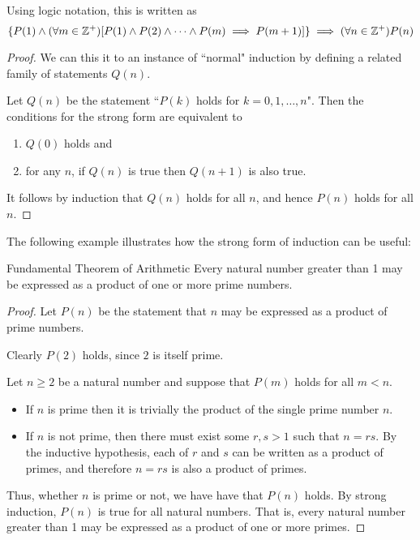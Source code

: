 Using logic notation, this is written as
\[ \{P(1) \land (\forall m \in \mathbb Z^+) [P(1) \land P(2) \land \cdots \land P(m) \implies P(m+1)]\} \implies (\forall n \in \mathbb Z^+)P(n) \]

\begin{proof}
We can this it to an instance of ``normal" induction by defining a related family of statements $Q(n)$. 

Let $Q(n)$ be the statement ``$P(k)$ holds for $k=0,1,\dots,n$". Then the conditions for the strong form are equivalent to 
\begin{enumerate}[label=(\roman*)]
\item $Q(0)$ holds and 
\item for any $n$, if $Q(n)$ is true then $Q(n+1)$ is also true.
\end{enumerate}
It follows by induction that $Q(n)$ holds for all $n$, and hence $P(n)$ holds for all $n$.
\end{proof}

The following example illustrates how the strong form of induction can be useful:

\begin{exmp}{Fundamental Theorem of Arithmetic}{}
Every natural number greater than 1 may be expressed as a product of one or more prime numbers.
\end{exmp}

\begin{proof}
Let $P(n)$ be the statement that $n$ may be expressed as a product of prime numbers. 

Clearly $P(2)$ holds, since $2$ is itself prime. 

Let $n \ge 2$ be a natural number and suppose that $P(m)$ holds for all $m<n$.

\begin{itemize}
\item If $n$ is prime then it is trivially the product of the single prime number $n$. 

\item If $n$ is not prime, then there must exist some $r, s > 1$ such that $n = rs$. By the inductive hypothesis, each of $r$ and $s$ can be written as a product of primes, and therefore $n = rs$ is also a product of primes.
\end{itemize}

Thus, whether $n$ is prime or not, we have have that $P(n)$ holds. By strong induction, $P(n)$ is true for all natural numbers. That is, every natural number greater than 1 may be expressed as a product of one or more primes.
\end{proof}

